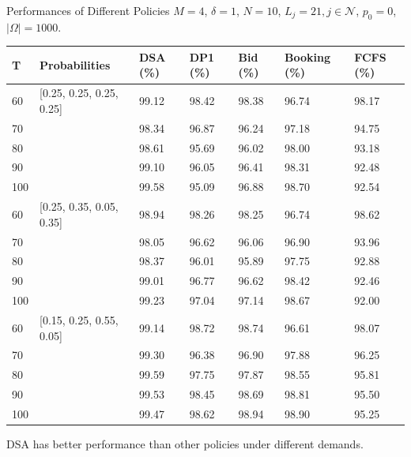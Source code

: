 
      
    \begin{frame}{Performances of Different Policies}
        \scriptsize
        $M =4$, $\delta =1$, $N =10$, $L_j =21, j \in \mathcal{N}$, $p_0 = 0$, $|\Omega| = 1000$.
        \begin{table}[ht]
          \centering
          \begin{tabular}{|l|l|l|l|l|l|l|}
          \hline
           T & Probabilities & DSA (\%) & DP1 (\%) & Bid (\%) & Booking (\%) & FCFS (\%) \\
          \hline
          60  & [0.25, 0.25, 0.25, 0.25]  & 99.12 & 98.42 & 98.38 & 96.74 & 98.17 \\
          70  &   & 98.34 & 96.87 & 96.24 & 97.18 & 94.75 \\
          80  &   & 98.61 & 95.69 & 96.02 & 98.00 & 93.18 \\
          90  &   & 99.10 & 96.05 & 96.41 & 98.31 & 92.48 \\
          100 &   & 99.58 & 95.09 & 96.88 & 98.70 & 92.54 \\
          \hline
          60  & [0.25, 0.35, 0.05, 0.35]  & 98.94 & 98.26 & 98.25 & 96.74 & 98.62 \\
          70  &   & 98.05 & 96.62 & 96.06 & 96.90 & 93.96 \\
          80  &   & 98.37 & 96.01 & 95.89 & 97.75 & 92.88 \\
          90  &   & 99.01 & 96.77 & 96.62 & 98.42 & 92.46 \\
          100 &   & 99.23 & 97.04 & 97.14 & 98.67 & 92.00 \\
          \hline
          60  & [0.15, 0.25, 0.55, 0.05]  & 99.14 & 98.72 & 98.74 & 96.61 & 98.07 \\
          70  &   & 99.30 & 96.38 & 96.90 & 97.88 & 96.25 \\
          80  &   & 99.59 & 97.75 & 97.87 & 98.55 & 95.81 \\
          90  &   & 99.53 & 98.45 & 98.69 & 98.81 & 95.50 \\
          100 &   & 99.47 & 98.62 & 98.94 & 98.90 & 95.25 \\
          \hline
          \end{tabular}
        \end{table}
        DSA has better performance than other policies under different demands.

    \end{frame}
      
